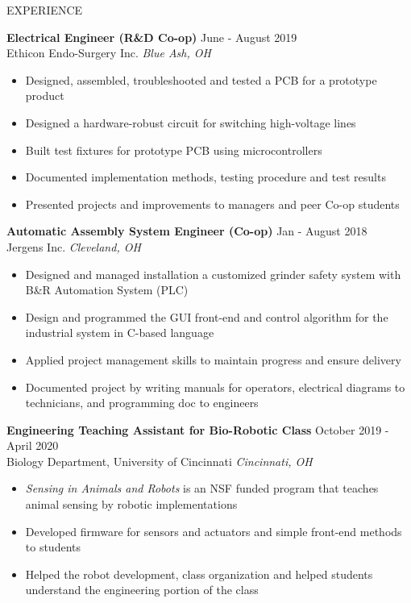 \documentclass{resume} %
\begin{document}
	\begin{rSection}{EXPERIENCE}
		
		\textbf{Electrical Engineer (R\&D Co-op)} \hfill June - August 2019\\
		Ethicon Endo-Surgery Inc. \hfill \textit{Blue Ash, OH}
		\begin{itemize}
			\itemsep -4pt {} 
			\item Designed, assembled, troubleshooted and tested a PCB for a prototype product
			\item Designed a hardware-robust circuit for switching high-voltage lines
			\item Built test fixtures for prototype PCB using microcontrollers
			\item Documented implementation methods, testing procedure and test results
			\item Presented projects and improvements to managers and peer Co-op students
		\end{itemize}
		
		\textbf{Automatic Assembly System Engineer (Co-op)} \hfill Jan - August 2018
		\\	Jergens Inc. \hfill \textit{Cleveland, OH}
		\begin{itemize}
			\itemsep -4pt {} 
			\item Designed and managed installation a customized grinder safety system with B\&R Automation System (PLC)
			\item Design and programmed the GUI front-end and control algorithm for the industrial system in C-based language
			\item Applied project management skills to maintain progress and ensure delivery
			\item Documented project by writing manuals for operators, electrical diagrams to technicians, and programming doc to engineers
		\end{itemize}
		
		
		\textbf{Engineering Teaching Assistant for Bio-Robotic Class} \hfill October 2019 - April 2020\\
		Biology Department, University of Cincinnati \hfill \textit{Cincinnati, OH}
		\begin{itemize}
			\itemsep -4pt {} 
			\item \textit{Sensing in Animals and Robots} is an NSF funded program that teaches animal sensing by robotic implementations
			\item Developed firmware for sensors and actuators and simple front-end methods to students
			\item Helped the robot development, class organization and helped students understand the engineering portion of the class
			
		\end{itemize}
	\end{rSection} 
	
\end{document}

